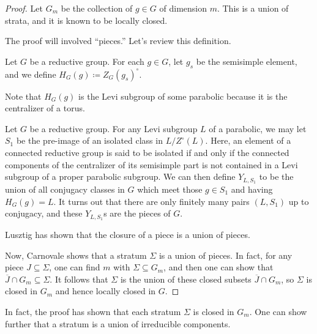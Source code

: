 \documentclass[../notes.tex]{subfiles}
\begin{document}
\begin{proof}
	Let $G_m$ be the collection of $g\in G$ of dimension $m$. This is a union of strata, and it is known to be locally closed. %

	The proof will involved ``pieces.'' Let's review this definition.
	\begin{notation}
		Let $G$ be a reductive group. For each $g\in G$, let $g_s$ be the semisimple element, and we define $H_G(g)\coloneqq Z_G(g_s)^\circ$.
	\end{notation}
	\begin{remark}
		Note that $H_G(g)$ is the Levi subgroup of some parabolic because it is the centralizer of a torus.
	\end{remark}
	\begin{definition}[piece]
		Let $G$ be a reductive group. For any Levi subgroup $L$ of a parabolic, we may let $S_1$ be the pre-image of an isolated class in $L/Z^\circ(L)$. Here, an element of a connected reductive group is said to be isolated if and only if the connected components of the centralizer of its semisimple part is not contained in a Levi subgroup of a proper parabolic subgroup. We can then define $Y_{L,S_1}$ to be the union of all conjugacy classes in $G$ which meet those $g\in S_1$ and having $H_G(g)=L$. It turns out that there are only finitely many pairs $(L,S_1)$ up to conjugacy, and these $Y_{L,S_1}$s are the pieces of $G$.
	\end{definition}
	\begin{remark}
		Lusztig has shown that the closure of a piece is a union of pieces.
	\end{remark}
	Now, Carnovale shows that a stratum $\Sigma$ is a union of pieces. In fact, for any piece $J\subseteq\Sigma$, one can find $m$ with $\Sigma\subseteq G_m$, and then one can show that $\overline J\cap G_m\subseteq\Sigma$. It follows that $\Sigma$ is the union of these closed subsets $\overline J\cap G_m$, so $\Sigma$ is closed in $G_m$ and hence locally closed in $G$.
\end{proof}
\begin{remark}
	In fact, the proof has shown that each stratum $\Sigma$ is closed in $G_m$. One can show further that a stratum is a union of irreducible components.
\end{remark}
\end{document}
